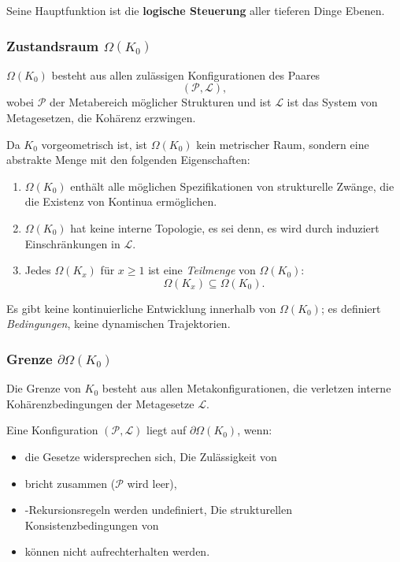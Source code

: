 Seine Hauptfunktion ist die \textbf{logische Steuerung} aller tieferen Dinge
Ebenen.

\subsubsection{Zustandsraum \texorpdfstring{$\Omega(K_0)$}{\Omega(K_0)}}

$\Omega(K_0)$ besteht aus allen zulässigen Konfigurationen des Paares
\[
(\mathcal{P}, \mathcal{L}),
\]
wobei $\mathcal{P}$ der Metabereich möglicher Strukturen und ist
$\mathcal{L}$ ist das System von Metagesetzen, die Kohärenz erzwingen.

Da $K_0$ vorgeometrisch ist, ist $\Omega(K_0)$ kein metrischer Raum, sondern
eine abstrakte Menge mit den folgenden Eigenschaften:
\begin{enumerate}
    \item $\Omega(K_0)$ enthält alle möglichen Spezifikationen von
          strukturelle Zwänge, die die Existenz von Kontinua ermöglichen.
    \item $\Omega(K_0)$ hat keine interne Topologie, es sei denn, es wird durch induziert
          Einschränkungen in $\mathcal{L}$.
    \item Jedes $\Omega(K_x)$ für $x \ge 1$ ist eine \emph{Teilmenge} von
          $\Omega(K_0)$:
          \[
              \Omega(K_x) \subseteq \Omega(K_0).
          \]
\end{enumerate}

Es gibt keine kontinuierliche Entwicklung innerhalb von $\Omega(K_0)$; es definiert
\emph{Bedingungen}, keine dynamischen Trajektorien.

\subsubsection{Grenze \texorpdfstring{$\partial\Omega(K_0)$}{\partial\Omega(K_0)}}

Die Grenze von $K_0$ besteht aus allen Metakonfigurationen, die verletzen
interne Kohärenzbedingungen der Metagesetze $\mathcal{L}$.

Eine Konfiguration $(\mathcal{P},\mathcal{L})$ liegt auf $\partial\Omega(K_0)$, wenn:
\begin{itemize}
    \item die Gesetze widersprechen sich,
    Die Zulässigkeit von \item bricht zusammen ($\mathcal{P}$ wird leer),
    \item-Rekursionsregeln werden undefiniert,
    Die strukturellen Konsistenzbedingungen von \item können nicht aufrechterhalten werden.
\end{itemize}

